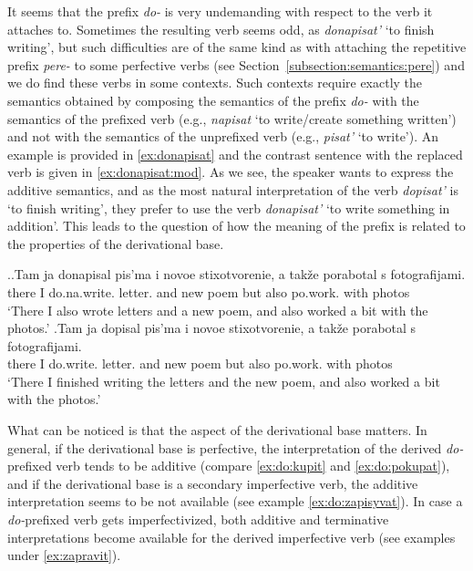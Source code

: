 It seems that the prefix \textit{do-} is very undemanding with respect to the verb it attaches to. Sometimes the resulting verb seems odd, as \textit{donapisat'} `to finish writing', but such difficulties are of the same kind as with attaching the repetitive prefix \textit{pere-} to some perfective verbs (see Section~\ref{subsection:semantics:pere}) and we do find these verbs in some contexts. Such contexts require exactly the semantics obtained by composing the semantics of the prefix \textit{do-} with the semantics of the prefixed verb (e.g., \textit{napisat} `to write/create something written') and not with the semantics of the unprefixed verb (e.g., \textit{pisat'} `to write'). An example is provided in \ref{ex:donapisat} and the contrast sentence with the replaced verb is given in \ref{ex:donapisat:mod}. As we see, the speaker wants to express the additive semantics, and as the most natural interpretation of the verb \textit{dopisat'} is `to finish writing', they prefer to use the verb \textit{donapisat'} `to write something in addition'. This leads to the question of how the meaning of the prefix is related to the properties of the derivational base.

\ex.\ag.\label{ex:donapisat}Tam ja donapisal pis'ma i novoe stixotvorenie, a tak\v{z}e porabotal s fotografijami.\\
there I do.na.write. letter. and new poem but also po.work. with photos\\
\trans `There I also wrote letters and a new poem, and also worked a bit with the photos.'
\bg.\label{ex:donapisat:mod}Tam ja dopisal pis'ma i novoe stixotvorenie, a tak\v{z}e porabotal s fotografijami.\\
there I do.write. letter. and new poem but also po.work. with photos\\
\trans `There I finished writing the letters and the new poem, and also worked a bit with the photos.'

What can be noticed is that the aspect of the derivational base matters. In general, if the derivational base is perfective, the interpretation of the derived \textit{do-}prefixed verb tends to be additive (compare \ref{ex:do:kupit} and \ref{ex:do:pokupat}), and if the derivational base is a secondary imperfective verb, the additive interpretation seems to be not available (see example \ref{ex:do:zapisyvat}). In case a \textit{do-}prefixed verb gets imperfectivized, both additive and terminative interpretations become available for the derived imperfective verb (see examples under \ref{ex:zapravit}).

